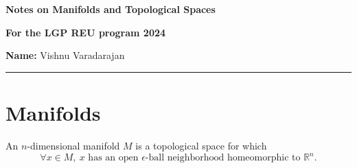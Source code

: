 \documentclass[a4paper]{article}
\begin{document}
\begin{center}
    

\vspace{0.1in}

{\large \bf \color{blue}  Notes on Manifolds and Topological Spaces} \\

\vspace{0.05in}

    { \bf \color{YellowOrange} For the LGP REU program 2024}
\end{center}
\medskip

\hfill {\textbf{Name:} Vishnu Varadarajan}

\bigskip
\hrule

\section{Manifolds}
An $n$-dimensional manifold $M$ is a topological space for which 
\[
\forall x \in M, \ x \text{ has an open } \epsilon\text{-ball neighborhood homeomorphic to } \mathbb{R}^n.
\]
\end{document}
